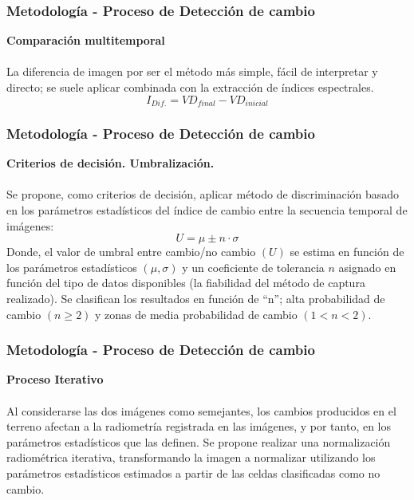 \documentclass[xcolor=table]{beamer}
\begin{document}
\begin{frame}
	\frametitle{Metodolog\'ia - Proceso de Detecci\'on de cambio}
	\textbf{Comparaci\'on multitemporal}\\~\\	
	La diferencia de imagen por ser el método más simple, fácil de interpretar y directo; se suele aplicar combinada con la extracción de índices espectrales.
	\begin{equation}
	I_{Dif.}=VD_{final}-VD_{inicial}
	\end{equation}

\end{frame}
\begin{frame}
	\frametitle{Metodolog\'ia - Proceso de Detecci\'on de cambio}
	\textbf{Criterios de decisi\'on. Umbralizaci\'on.}\\~\\	
Se propone, como criterios de decisi\'on, aplicar m\'etodo de discriminaci\'on basado en los par\'ametros estad\'isticos del \'indice de cambio entre la secuencia temporal de im\'agenes:
	\begin{equation}
U=\mu\pm n\cdot\sigma
	\end{equation}
	Donde, el valor de umbral entre cambio/no cambio $(U)$ se estima en funci\'on de los par\'ametros estad\'isticos $(\mu,\sigma) $ y un coeficiente de tolerancia $ n $ asignado en funci\'on del tipo de datos disponibles (la fiabilidad del m\'etodo de captura realizado). Se clasifican los resultados en funci\'on de “n”; alta probabilidad de cambio $ (n\geq2) $  y zonas de media probabilidad de cambio $ (1<n<2) $.
	
\end{frame}
\begin{frame}
	\frametitle{Metodolog\'ia - Proceso de Detecci\'on de cambio}
	\textbf{Proceso Iterativo}\\~\\	
Al considerarse las dos im\'agenes como semejantes, los cambios producidos en el terreno afectan a la radiometr\'ia registrada en las im\'agenes, y por tanto, en los par\'ametros estad\'isticos que las definen.
Se propone realizar una normalizaci\'on radiom\'etrica iterativa, transformando la imagen a normalizar utilizando los par\'ametros estad\'isticos estimados a partir de las celdas clasificadas como no cambio. 
\end{frame}
\end{document}
